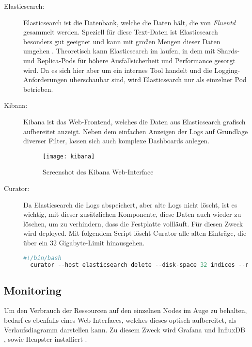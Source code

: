 \begin{description}
  \item[Elasticsearch:]
  Elasticsearch ist die Datenbank, welche die Daten hält, die von \emph{Fluentd}
  gesammelt werden.
  Speziell für diese Text-Daten ist Elasticsearch besonders gut geeignet und kann
  mit großen Mengen dieser Daten umgehen \cite{elasticsearch}.
  Theoretisch kann Elasticsearch im  laufen, in dem
  mit Shards- und Replica-Pods für höhere Ausfallsicherheit und Performance
  gesorgt wird.
  Da es sich hier aber um ein internes Tool handelt und die
  Logging-Anforderungen überschaubar sind,
  wird Elasticsearch
  nur als einzelner Pod
  betrieben.

  \item[Kibana:]
  Kibana ist das Web-Frontend, welches die Daten aus Elasticsearch
  grafisch aufbereitet anzeigt. Neben dem einfachen Anzeigen der
  Logs auf Grundlage
  diverser Filter,
  lassen sich auch komplexe Dashboards anlegen.
  \begin{figure}[H]
  \centering
  \texttt{[image: kibana]}
  \caption{Screenshot des Kibana Web-Interface}
  \end{figure}

  \item[Curator:]
  Da Elasticsearch die Logs abspeichert, aber alte Logs nicht löscht, ist es
  wichtig, mit dieser zusätzlichen Komponente, diese Daten auch wieder zu löschen,
  um zu verhindern, dass die Festplatte vollläuft.
  Für diesen Zweck wird  deployed.
  Mit folgendem Script löscht Curator alle alten Einträge, die über ein
  32 Gigabyte-Limit hinausgehen. \cite{curator}
  \begin{lstlisting}[language=Python,numbers=none,breaklines=true]
  #!/bin/bash
  curator --host elasticsearch delete --disk-space 32 indices --regex '^logstash-'\end{lstlisting}
\end{description}

\subsection{Monitoring}

Um den Verbrauch der Ressourcen auf den einzelnen Nodes im Auge zu behalten,
bedarf es ebenfalls eines Web-Interfaces, welches dieses optisch aufbereitet,
als Verlaufsdiagramm darstellen kann.
Zu diesem Zweck wird Grafana \cite{Grafana} und InfluxDB \cite{influxdb}, sowie Heapster \cite{heapster}
installiert \cite{gupta}.


